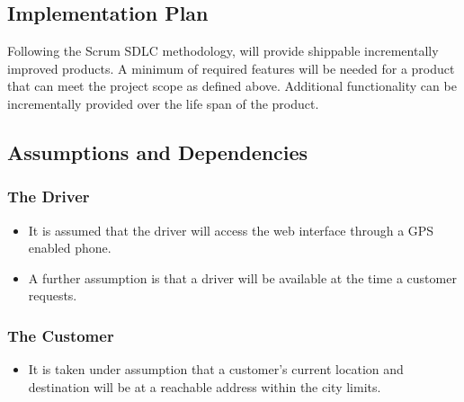 \documentclass[10pt,twocolumn]{witseiepaper}
\begin{document}
\subsection{Implementation Plan}

Following the Scrum SDLC methodology, will provide shippable incrementally improved products. A minimum of required features will be needed for a product that can meet the project scope as defined above. Additional functionality can be incrementally provided over the life span of the product.

\subsection{Assumptions and Dependencies}

\subsubsection{The Driver}
\begin{itemize}
\item It is assumed that the driver will access the web interface through a GPS enabled phone.
\item A further assumption is that a driver will be available at the time a customer requests.
\end{itemize}

\subsubsection{The Customer}
\begin{itemize}
\item It is taken under assumption that a customer's current location and destination will be at a reachable address within the city limits.
\end{itemize}

%



\end{document}

